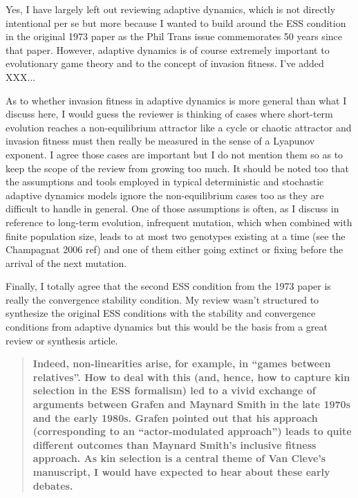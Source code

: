 \documentclass[10pt,parskip=full,foldmarks=off,addrfield=off,backaddress=false,refline=dateleft,letterpaper]{scrlttr2}
\newenvironment{reviewerquote}{\begin{quote}\color{DarkBlue}\bfseries}{\end{quote}}
\begin{document}
\begin{letter}
Yes, I have largely left out reviewing adaptive dynamics, which is not directly intentional per se but more because I wanted to build around the ESS condition in the original 1973 paper as the Phil Trans issue commemorates 50 years since that paper. However, adaptive dynamics is of course extremely important to evolutionary game theory and to the concept of invasion fitness. I've added XXX...

As to whether invasion fitness in adaptive dynamics is more general than what I discuss here, I would guess the reviewer is thinking of cases where short-term evolution reaches a non-equilibrium attractor like a cycle or chaotic attractor and invasion fitness must then really be measured in the sense of a Lyapunov exponent. I agree those cases are important but I do not mention them so as to keep the scope of the review from growing too much. It should be noted too that the assumptions and tools employed in typical deterministic and stochastic adaptive dynamics models ignore the non-equilibrium cases too as they are difficult to handle in general. One of those assumptions is often, as I discuss in reference to long-term evolution, infrequent mutation, which when combined with finite population size, leads to at most two genotypes existing at a time (see the Champagnat 2006 ref) and one of them either going extinct or fixing before the arrival of the next mutation.

Finally, I totally agree that the second ESS condition from the 1973 paper is really the convergence stability condition. My review wasn't structured to synthesize the original ESS conditions with the stability and convergence conditions from adaptive dynamics but this would be the basis from a great review or synthesis article. %

\begin{reviewerquote}
  Indeed, non-linearities arise, for example, in “games between relatives”. How to deal with this (and, hence, how to capture kin selection in the ESS formalism) led to a vivid exchange of arguments between Grafen and Maynard Smith in the late 1970s and the early 1980s. Grafen pointed out that his approach (corresponding to an “actor-modulated approach”) leads to quite different outcomes than Maynard Smith’s inclusive fitness approach. As kin selection is a central theme of Van Cleve’s manuscript, I would have expected to hear about these early debates.
\end{reviewerquote}


\end{letter}
\end{document}
